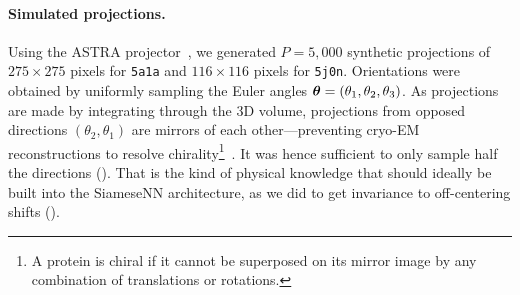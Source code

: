 \paragraph{Simulated projections.}
Using the ASTRA projector~\cite{van2015astra}, we generated $P=5,000$ synthetic projections of $275 \times 275$ pixels for \texttt{5a1a} and $116 \times 116$ pixels for \texttt{5j0n}.
Orientations were obtained by uniformly sampling the Euler angles ${\boldsymbol{\theta}} = (\theta_1,\theta_2,\theta_3)$.
As projections are made by integrating through the 3D volume, projections from opposed directions $(\theta_2,\theta_1)$ are mirrors of each other---preventing cryo-EM reconstructions to resolve chirality\footnote{A protein is chiral if it cannot be superposed on its mirror image by any combination of translations or rotations.}~.
It was hence sufficient to only sample half the directions \todo{$\theta_1 \in [0, \pi[ \; \subset [0, 2\pi[$} (). %
That is the kind of physical knowledge that should ideally be built into the SiameseNN architecture, as we did to get invariance to off-centering shifts ().

